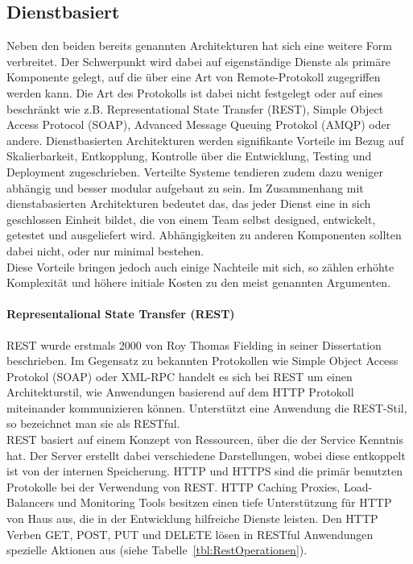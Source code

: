 	\subsection{Dienstbasiert}
	Neben den beiden bereits genannten Architekturen hat sich eine weitere Form verbreitet. Der Schwerpunkt wird dabei auf eigenständige Dienste als primäre Komponente gelegt, auf die über eine Art von Remote-Protokoll zugegriffen werden kann. Die Art des Protokolls ist dabei nicht festgelegt oder auf eines beschränkt wie z.B. Representational State Transfer (REST), Simple Object Access Protocol (SOAP), Advanced Message Queuing Protokol (AMQP) oder andere.
	Dienstbasierten Architekturen werden signifikante Vorteile im Bezug auf Skalierbarkeit, Entkopplung, Kontrolle über die Entwicklung, Testing und Deployment zugeschrieben. Verteilte Systeme tendieren zudem dazu weniger abhängig und besser modular aufgebaut zu sein. Im Zusammenhang mit dienstabasierten Architekturen bedeutet das, das jeder Dienst eine in sich geschlossen Einheit bildet, die von einem Team selbst designed, entwickelt, getestet und ausgeliefert wird.  Abhängigkeiten zu anderen Komponenten sollten dabei nicht, oder nur minimal bestehen. \\
	Diese Vorteile bringen jedoch auch einige Nachteile mit sich, so zählen erhöhte Komplexität und höhere initiale Kosten zu den meist genannten Argumenten.
	
	\paragraph{Representalional State Transfer (REST)}
		REST wurde erstmals 2000 von Roy Thomas Fielding in seiner Dissertation beschrieben. Im Gegensatz zu bekannten Protokollen wie Simple Object Access Protokol (SOAP) oder XML-RPC handelt es sich bei REST um einen Architekturstil, wie Anwendungen basierend auf dem HTTP Protokoll miteinander kommunizieren können. Unterstützt eine Anwendung die REST-Stil, so bezeichnet man sie als RESTful.
		\cite[vgl.][]{Melzer.2010} \\
		REST basiert auf einem Konzept von Ressourcen, über die der Service Kenntnis hat. Der Server erstellt dabei verschiedene Darstellungen, wobei diese entkoppelt ist von der internen Speicherung.
		HTTP und HTTPS sind die primär benutzten Protokolle bei der Verwendung von REST. HTTP Caching Proxies, Load-Balancers und Monitoring Tools besitzen einen tiefe Unterstützung für HTTP von Haus aus, die in der Entwicklung hilfreiche Dienste leisten.
		Den HTTP Verben GET, POST, PUT und DELETE lösen in RESTful Anwendungen spezielle Aktionen aus (siehe Tabelle~\ref{tbl:RestOperationen}).
		\\
		
